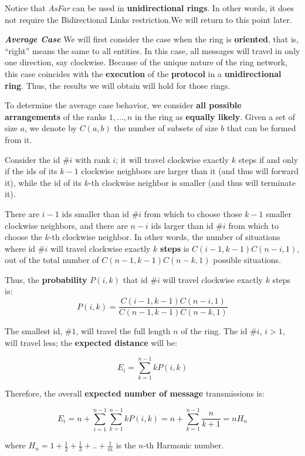 Notice that \textit{AsFar} can be used in \textbf{unidirectional rings}. In other words, it does not require the Bidirectional Links restriction.We will return to this point later.

\textit{\textbf{Average Case}} We will first consider the case when the ring is \textbf{oriented}, that is, “right” means the same to all entities. In this case, all messages will travel in only one direction, say clockwise. Because of the unique nature of the ring network, this case coincides with the \textbf{execution} of the \textbf{protocol} in a \textbf{unidirectional ring}. Thus, the results we will obtain will hold for those rings.

To determine the average case behavior, we consider \textbf{all possible arrangements} of the ranks $1,...,n$ in the ring as \textbf{equally likely}. Given a set of size $a$, we denote by $C(a, b)$ the number of subsets of size $b$ that can be formed from it. 

Consider the id $\#i$ with rank $i$; it will travel clockwise exactly $k$ steps if and only if the ids of its $k - 1$ clockwise neighbors are larger than it (and thus will forward it), while the id of its $k$-th clockwise neighbor is smaller (and thus will terminate it). 

There are $i - 1$ ids smaller than id $\#i$ from which to choose those $k - 1$ smaller clockwise neighbors, and there are $n - i$ ids larger than id $\#i$ from which to choose the $k$-th clockwise neighbor. In other words, the number of situations where id $\#i$ will travel clockwise exactly $k$ \textbf{steps} is $C(i - 1,k - 1)C(n - i, 1)$, out of the total number of $C(n - 1,k - 1)C(n - k, 1)$ possible situations. 

Thus, the \textbf{probability} $P(i, k)$ that id $\#i$ will travel clockwise exactly $k$ steps is:
$$P(i, k) = \frac{C(i - 1,k - 1)C(n - i, 1)}{C(n - 1,k - 1)C(n - k, 1)}$$

The smallest id, $\#1$, will travel the full length $n$ of the ring. The id $\#i$, $i> 1$, will travel less; the \textbf{expected distance} will be: 

$$
E_i = \sum_{k = 1}^{n-1} k P(i,k)
$$

Therefore, the overall \textbf{expected number of message} transmissions is:

$$
E_i = n + \sum_{i = 1}^{n-1}  \sum_{k = 1}^{n-1} k P(i,k) = n + \sum_{k = 1}^{n-1} \frac{n}{k+1} = n H_n
$$ 

where $H_n = 1 + \frac{1}{2} + \frac{1}{3} + .. + \frac{1}{m}$ is the $n$-th Harmonic number. 

